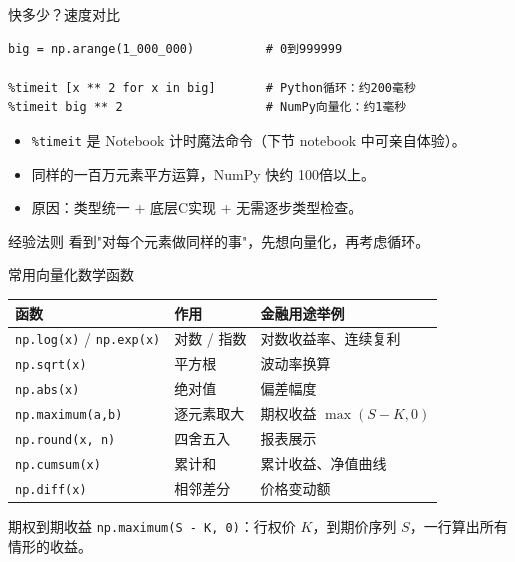 \documentclass[9pt]{ctexbeamer}
\begin{document}
\begin{frame}[fragile]{快多少？速度对比}
	\begin{lstlisting}
big = np.arange(1_000_000)          # 0到999999

%timeit [x ** 2 for x in big]       # Python循环：约200毫秒
%timeit big ** 2                    # NumPy向量化：约1毫秒
\end{lstlisting}
	\begin{itemize}
		\item \texttt{\%timeit} 是 Notebook 计时魔法命令（下节 notebook 中可亲自体验）。
		\item 同样的一百万元素平方运算，NumPy 快约 \alert{100倍以上}。
		\item 原因：类型统一 + 底层C实现 + 无需逐步类型检查。
	\end{itemize}
	\begin{block}{经验法则}
		看到"对每个元素做同样的事"，先想向量化，再考虑循环。
	\end{block}
\end{frame}

\begin{frame}[fragile]{常用向量化数学函数}
	\begin{table}
		\centering
		\begin{tabular}{lll}
			\toprule
			函数 & 作用 & 金融用途举例 \\
			\midrule
			\texttt{np.log(x)} / \texttt{np.exp(x)} & 对数 / 指数 & 对数收益率、连续复利 \\
			\texttt{np.sqrt(x)} & 平方根 & 波动率换算 \\
			\texttt{np.abs(x)} & 绝对值 & 偏差幅度 \\
			\texttt{np.maximum(a,b)} & 逐元素取大 & 期权收益 $\max(S-K,0)$ \\
			\texttt{np.round(x, n)} & 四舍五入 & 报表展示 \\
			\texttt{np.cumsum(x)} & 累计和 & 累计收益、净值曲线 \\
			\texttt{np.diff(x)} & 相邻差分 & 价格变动额 \\
			\bottomrule
		\end{tabular}
	\end{table}
	\begin{exampleblock}{期权到期收益}
		\texttt{np.maximum(S - K, 0)}：行权价 $K$，到期价序列 $S$，一行算出所有情形的收益。
	\end{exampleblock}
\end{frame}


\end{document}
